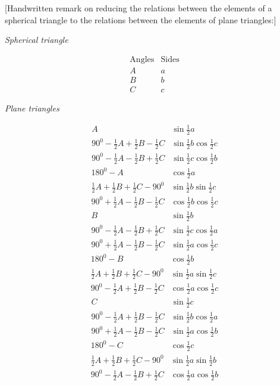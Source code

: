 %
\par\medskip{}
[Handwritten remark on reducing the relations between the elements of a spherical triangle to the relations between the elements of plane triangles:]
\begin{center}\textit{Spherical triangle}\end{center}
\[
\begin{array}{cc}\text{Angles}&\text{Sides}\\ A&a\\B&b\\C&c\end{array}
\]
\begin{center}\textit{Plane triangles}\end{center}
\[
\begin{array}{ll}
A&\sin\tfrac12a\\
90^0-\tfrac12A+\tfrac12B-\tfrac12C&\sin\tfrac12b\cos\tfrac12c\\
90^0-\tfrac12A-\tfrac12B+\tfrac12C&\sin\tfrac12c\cos\tfrac12b
\end{array}
\]
\[
\begin{array}{ll}
180^0-A&\cos\tfrac12a\\
\tfrac12A+\tfrac12B+\tfrac12C-90^0&\sin\tfrac12b\sin\tfrac12c\\
90^0+\tfrac12A-\tfrac12B-\tfrac12C&\cos\tfrac12b\cos\tfrac12c
\end{array}
\]
\[
\begin{array}{ll}
B&\sin\tfrac12b\\
90^0-\tfrac12A-\tfrac12B+\tfrac12C&\sin\tfrac12c\cos\tfrac12a\\
90^0+\tfrac12A-\tfrac12B-\tfrac12C&\sin\tfrac12a\cos\tfrac12c
\end{array}
\]
\[
\begin{array}{ll}
180^0-B&\cos\tfrac12b\\
\tfrac12A+\tfrac12B+\tfrac12C-90^0&\sin\tfrac12a\sin\tfrac12c\\
90^0-\tfrac12A+\tfrac12B-\tfrac12C&\cos\tfrac12a\cos\tfrac12c
\end{array}
\]
\[
\begin{array}{ll}
C&\sin\tfrac12c\\
90^0-\tfrac12A+\tfrac12B-\tfrac12C&\sin\tfrac12b\cos\tfrac12a\\
90^0+\tfrac12A-\tfrac12B-\tfrac12C&\sin\tfrac12a\cos\tfrac12b
\end{array}
\]
\[
\begin{array}{ll}
180^0-C&\cos\tfrac12c\\
\tfrac12A+\tfrac12B+\tfrac12C-90^0&\sin\tfrac12a\sin\tfrac12b\\
90^0-\tfrac12A-\tfrac12B+\tfrac12C&\cos\tfrac12a\cos\tfrac12b
\end{array}
\]
